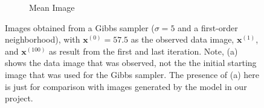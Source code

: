 \begin{figure}[!h]
\begin{subfigure}[b]{0.24\textwidth}
            \caption[]%
            {{\small Mean Image}}    
            \label{fig:5755d1mean}
        \end{subfigure}
        \caption[]
        {\small Images obtained from a Gibbs sampler ($\sigma=5$ and a first-order neighborhood), with $\mathbf{x}^{(0)}=57.5$ as the observed data image, $\mathbf{x}^{(1)}$, and $\mathbf{x}^{(100)}$ as result from the first and last iteration. Note, (a) shows the data image that was observed, not the the initial starting image that was used for the Gibbs sampler. The presence of (a) here is just for comparison with images generated by the model in our project.}
        \label{fig:5755d1}
    \end{figure}